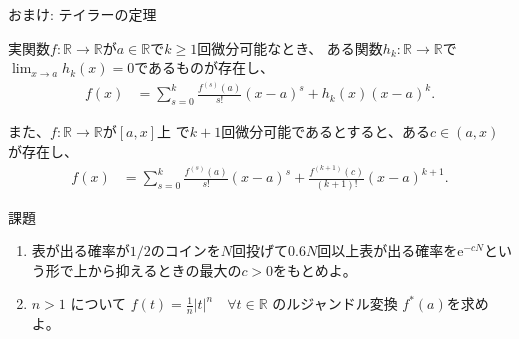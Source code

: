 \documentclass[lualatex,handout]{beamer}
\theoremstyle{definition}
\begin{document}
\begin{frame}{おまけ: テイラーの定理}
\begin{theorem}[テイラーの定理]
実関数$f\colon\mathbb{R}\to\mathbb{R}$が$a\in\mathbb{R}$で$k\ge 1$回微分可能なとき、
ある関数$h_k\colon\mathbb{R}\to\mathbb{R}$で$\lim_{x\to a}h_k(x)=0$であるものが存在し、
\begin{align*}
f(x) &= \sum_{s=0}^k \frac{f^{(s)}(a)}{s!}(x-a)^s + h_k(x)(x-a)^k.
\end{align*}

また、$f\colon\mathbb{R}\to\mathbb{R}$が$[a, x]$上 で$k+1$回微分可能であるとすると、ある$c\in(a, x)$が存在し、
\begin{align*}
f(x) &= \sum_{s=0}^k \frac{f^{(s)}(a)}{s!}(x-a)^s + \frac{f^{(k+1)}(c)}{(k+1)!}(x-a)^{k+1}.
\end{align*}
\end{theorem}
\end{frame}

\begin{frame}{課題}
\begin{enumerate}
\setlength{\itemsep}{2em}
\item 表が出る確率が$1/2$のコインを$N$回投げて$0.6N$回以上表が出る確率を$\mathrm{e}^{-cN}$という形で上から抑えるときの最大の$c>0$をもとめよ。
\item $n> 1$ について $f(t) = \frac1n |t|^n \quad\forall t\in\mathbb{R}$ のルジャンドル変換 $f^*(a)$を求めよ。
\end{enumerate}
\end{frame}

\end{document}
